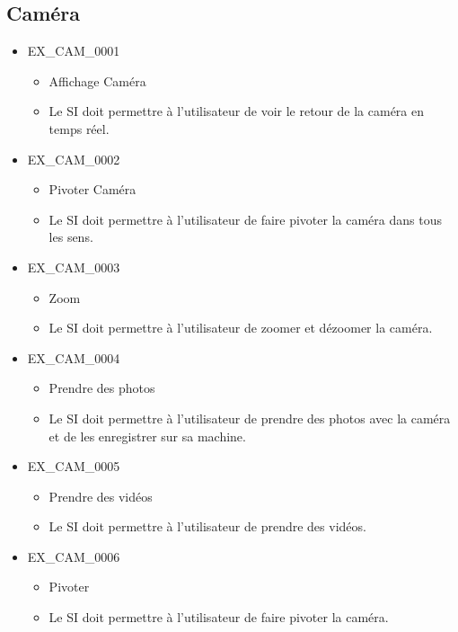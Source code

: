 \documentclass[12pt,a4paper]{scrartcl}
\begin{document}
\subsection{Caméra}

\begin{itemize}


\item EX\_CAM\_0001
\begin{itemize}
\item Affichage Caméra
\item Le SI doit permettre à l'utilisateur de voir le retour de la caméra en
		temps réel.
\end{itemize}

\item EX\_CAM\_0002
\begin{itemize}
\item Pivoter Caméra
\item Le SI doit permettre à l'utilisateur de faire pivoter la caméra dans
	tous les sens.
\end{itemize}

\item EX\_CAM\_0003
\begin{itemize}
\item Zoom
\item Le SI doit permettre à l'utilisateur de zoomer et dézoomer la caméra.
\end{itemize}


\item EX\_CAM\_0004
\begin{itemize}
\item Prendre des photos
\item Le SI doit permettre à l'utilisateur de prendre des photos avec la caméra 			et de les enregistrer sur sa machine.
\end{itemize}

\item EX\_CAM\_0005
\begin{itemize}
\item Prendre des vidéos
\item Le SI doit permettre à l'utilisateur de prendre des vidéos.
\end{itemize}

\item EX\_CAM\_0006
\begin{itemize}
\item Pivoter
\item Le SI doit permettre à l'utilisateur de faire pivoter la caméra.
\end{itemize}


\end{itemize}
\end{document}
